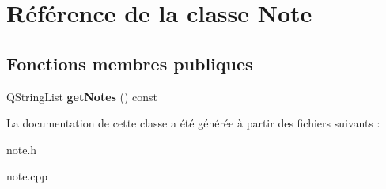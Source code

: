 \hypertarget{class_note}{\section{Référence de la classe Note}
\label{class_note}
}
\subsection*{Fonctions membres publiques}
\begin{DoxyCompactItemize}
\item 
\hypertarget{class_note_a59ccedfa5152470ea7ed600f0b34b423}{Q\+String\+List {\bfseries get\+Notes} () const }\label{class_note_a59ccedfa5152470ea7ed600f0b34b423}

\end{DoxyCompactItemize}


La documentation de cette classe a été générée à partir des fichiers suivants \+:\begin{DoxyCompactItemize}
\item 
note.\+h\item 
note.\+cpp\end{DoxyCompactItemize}
